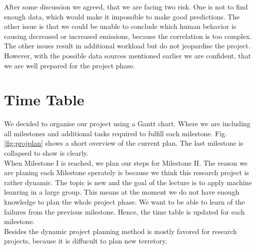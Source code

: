 \documentclass[lang=english,inputenc=utf8,fontsize=10pt]{ldvarticle}
\begin{document}
After some discussion we agreed, that we are facing two risk. One is not to find enough data, which would make it impossible to make good predictions. The other issue is that we could be unable to conclude which human behavior is causing decreased or increased emissions, because the correlation is too complex.\\
The other issues result in additional workload but do not jeopardise the project. However, with the possible data sources mentioned earlier we are confident, that we are well prepared for the project phase.\\



\section{Time Table}

We decided to organise our project using a Gantt chart. Where we are including all milestones and additional tasks required to fulfill each milestone. Fig. \ref{fig:projplan} shows a short overview of the current plan. The last milestone is collapsed to show is clearly.\\
When Milestone I is reached, we plan our steps for Milestone II. The reason we are planing each Milestone sperately is because we think this research project is rather dynamic. The topic is new and the goal of the lecture is to apply machine leanring in a large group. This means at the moment we do not have enough knowledge to plan the whole project phase. We want to be able to learn of the failures from the previous milestone. Hence, the time table is updated for each milestone.\\
Besides the dynamic project planning method is mostly favored for research projects, because it is diffucult to plan new terretory.\\


\begin{figure}[ht]
\end{figure}
\end{document}
